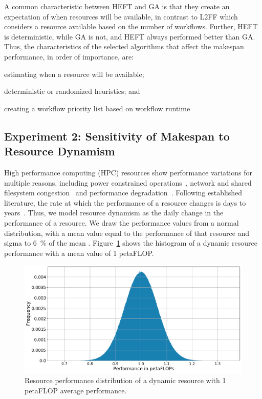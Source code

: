 A common characteristic between HEFT and GA is that they create an expectation
of when resources will be available, in contrast to L2FF which considers a
resource available based on the number of workflows.
Further, HEFT is deterministic, while GA is not, and HEFT always performed
better than GA.
Thus, the characteristics of the selected algorithms that affect the
makespan performance, in order of importance, are:
\begin{inparaenum}[(1)]
    \item estimating when a resource will be available;
    \item deterministic or randomized heuristics; and
    \item creating a workflow priority list based on workflow runtime
\end{inparaenum}

\subsection{Experiment 2: Sensitivity of Makespan to Resource Dynamism}

High performance computing (HPC) resources show performance variations for
multiple reasons, including power constrained
operations~\cite{inadomi2015analyzing}, network and shared filesystem
congestion~\cite{brown2018interference} and performance
degradation~\cite{wu2017survey}. Following established literature, the rate at
which the performance of a resource changes is days to
years~\cite{skinner2005understanding}. Thus, we model resource dynamism as the
daily change in the performance of a resource. We draw the performance values
from a normal distribution, with a mean value equal to the performance of that
resource and sigma to 6~\% of the mean .
Figure~\ref{fig:dynamic_res} shows the histogram of a dynamic resource
performance with a mean value of 1 petaFLOP.

\begin{figure}[t]
    \centering
    \includegraphics[width=.75\textwidth]{figures/campaign/DynRes.pdf}
    \caption{Resource performance distribution of a dynamic resource with 1
    petaFLOP average performance.}
    \label{fig:dynamic_res}
\end{figure}

